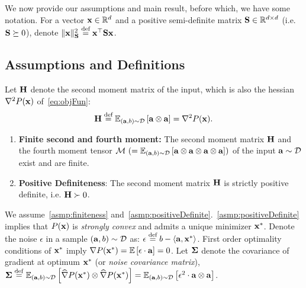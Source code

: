 \label{sec:prob}

We now provide our assumptions and main result, before which, we have some notation. For a vector $\x\in\R^d$ and a positive semi-definite matrix $\S\in\R^{d\times d}$ (i.e. $\S\succeq0$), denote $\|\x\|^2_\S \eqdef  \x\T \S \x$.\vspace*{-2mm}
\subsection{Assumptions and Definitions}
Let $\Cov$ denote the second moment matrix of the input, which is also the hessian $\nabla^2P(\x)$ of~\eqref{eq:objFun}:%
\vspace{-0.2cm}
\begin{align*}
\Cov \eqdef \Eover{\distr}{\a\otimes\a} = \nabla^2P(\x).
\end{align*}
\vspace{-.8cm}
\begin{enumerate}[leftmargin=*,label=$\mathbf{(\mathcal A\arabic*)}$]
\item \label{asmp:finiteness} \textbf{Finite second and fourth moment:} The second moment matrix $\H$ and the fourth moment tensor $\M\ (=\Eover{\distr}{\a\otimes\a\otimes\a\otimes\a})$ of the input $\a\sim\D$ exist and are finite.
\item \label{asmp:positiveDefinite}\textbf{Positive Definiteness}: The second moment matrix $\Cov$ is strictly positive definite, i.e. $\Cov\succ0$.
\end{enumerate}

\noindent We assume~\ref{asmp:finiteness} and~\ref{asmp:positiveDefinite}.~\ref{asmp:positiveDefinite} implies that $P(\x)$
is {\em strongly convex} and admits a unique minimizer
$\xs$. Denote the noise $\epsilon$ in a sample $(\a,b)\sim\D$ as: $\n \eqdef \b - \iprod{\a}{\xs}$. First order optimality conditions of $\xs$ imply $\nabla P(\xs) = \E{\n \cdot \a} = 0$.
Let $\Sig$ denote the covariance of gradient at optimum $\xs$ (or {\em noise covariance matrix}), $\Sig \defeq\Eover{\distr}{\widehat{\nabla}P(\xs)\otimes\widehat{\nabla}P(\xs)}=\Eover{\distr}{\n^2\cdot\a\otimes\a}$.

